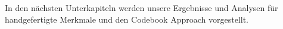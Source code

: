
In den nächsten Unterkapiteln werden unsere Ergebnisse und Analysen für handgefertigte Merkmale und den Codebook Approach vorgestellt.










